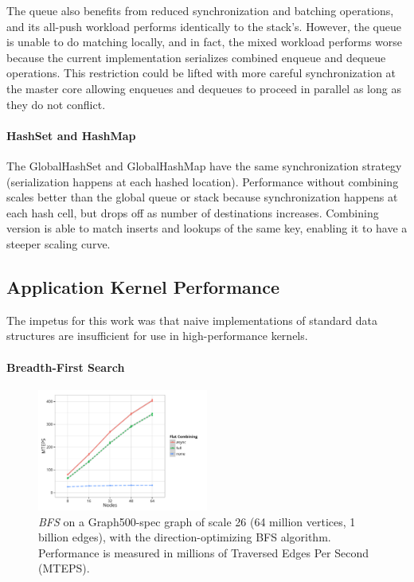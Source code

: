 The queue also benefits from reduced synchronization and batching operations, and its all-push workload performs identically to the stack's.
However, the queue is unable to do matching locally, and in fact, the mixed workload performs worse because the current implementation serializes combined enqueue and dequeue operations. This restriction could be lifted with more careful synchronization at the master core allowing enqueues and dequeues to proceed in parallel as long as they do not conflict.

\paragraph{HashSet and HashMap}
The GlobalHashSet and GlobalHashMap have the same synchronization strategy (serialization happens at each hashed location).
Performance without combining scales better than the global queue or stack because synchronization happens at each hash cell, but drops off as number of destinations increases. Combining version is able to match inserts and lookups of the same key, enabling it to have a steeper scaling curve.

\subsection{Application Kernel Performance}
The impetus for this work was that naive implementations of standard data structures are insufficient for use in high-performance kernels.

\paragraph{Breadth-First Search}
\begin{figure}[t]
  \centering
  \includegraphics[width=0.5\textwidth]{data/plots/bfs_perf.pdf}
  \caption{\emph{BFS} on a Graph500-spec graph of scale 26 (64 million vertices, 1 billion edges), with the direction-optimizing BFS algorithm. Performance is measured in millions of Traversed Edges Per Second (MTEPS).}
  \label{fig:bfs_perf}
\end{figure}


